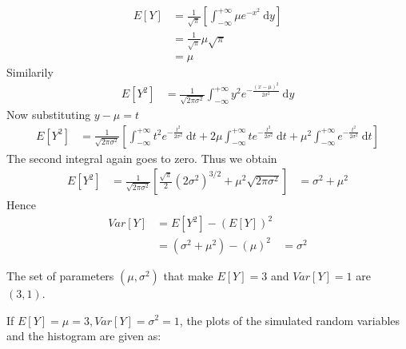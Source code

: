 \documentclass[12pt]{article}
\begin{document}
\begin{equation*}
\begin{aligned}
E[Y] &= \frac{1}{\sqrt{\pi}}\left[\int_{-\infty}^{+\infty} \!\mu e^{-x^2}\ \mathrm{d}y \right] \\
&= \frac{1}{\sqrt{\pi}}\mu\sqrt{\pi}\\
&= \mu
\end{aligned}
\end{equation*}
Similarily
\begin{equation*}
\begin{aligned}
E[Y^2] &= \frac{1}{\sqrt{2\pi\sigma^2}}\int_{-\infty}^{+\infty}\!y^2e^{-\frac{(x-\mu)^2}{2\sigma^2}}\ \mathrm{d}y
\end{aligned}
\end{equation*}
Now substituting $y-\mu=t$
\begin{equation*}
\begin{aligned}
E[Y^2] &= \frac{1}{\sqrt{2\pi\sigma^2}}\left[\int_{-\infty}^{+\infty}\!t^2e^{-\frac{t^2}{2\sigma^2}}\ \mathrm{d}t+2\mu\int_{-\infty}^{+\infty}\!te^{-\frac{t^2}{2\sigma^2}}\ \mathrm{d}t+\mu^2\int_{-\infty}^{+\infty}\!e^{-\frac{t^2}{2\sigma^2}}\ \mathrm{d}t\right]
\end{aligned}
\end{equation*}
The second integral again goes to zero. Thus we obtain
\begin{equation*}
\begin{aligned}
E[Y^2] &= \frac{1}{\sqrt{2\pi\sigma^2}}\left[\frac{\sqrt{\pi}}{2}(2\sigma^2)^{3/2}+\mu^2\sqrt{2\pi\sigma^2}\right]
&= \sigma^2+\mu^2
\end{aligned}
\end{equation*}
Hence
\begin{equation*}
\begin{aligned}
Var[Y]&=E[Y^2]-(E[Y])^2\\
&= (\sigma^2+\mu^2)-(\mu)^2
&= \sigma^2
\end{aligned}
\end{equation*}
\item The set of parameters $(\mu, \sigma^2)$ that make $E[Y]=3$ and $Var[Y]=1$ are $(3,1)$.
\item If $E[Y]=\mu=3, Var[Y]=\sigma^2=1$, the plots of the simulated random variables and the histogram are given as:
\end{document}
